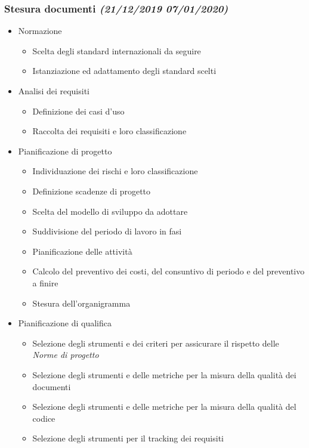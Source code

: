 \documentclass[../piano-di-progetto.tex]{subfiles}
\begin{document}
\subsubsection[Analisi e pianificazione]{Stesura documenti {\normalsize\normalfont\itshape(21/12/2019  07/01/2020)}}%
\label{subs:analisi_e_pianificazione}
\begin{itemize}
  \item Normazione
  \begin{itemize}
    \item Scelta degli standard internazionali da seguire
    \item Istanziazione ed adattamento degli standard scelti
  \end{itemize}
  \item Analisi dei requisiti
  \begin{itemize}
    \item Definizione dei casi d'uso
    \item Raccolta dei requisiti e loro classificazione
  \end{itemize}
  \item Pianificazione di progetto
  \begin{itemize}
    \item Individuazione dei rischi e loro classificazione
    \item Definizione scadenze di progetto
    \item Scelta del modello di sviluppo da adottare
    \item Suddivisione del periodo di lavoro in fasi
    \item Pianificazione delle attività
    \item Calcolo del preventivo dei costi, del consuntivo di periodo e del preventivo a finire
    \item Stesura dell'organigramma
  \end{itemize}
  \item Pianificazione di qualifica
  \begin{itemize}
    \item Selezione degli strumenti e dei criteri per assicurare il rispetto delle \textit{Norme di progetto}
    \item Selezione degli strumenti e delle metriche per la misura della qualità dei documenti
    \item Selezione degli strumenti e delle metriche per la misura della qualità del codice
    \item Selezione degli strumenti per il tracking dei requisiti

\end{itemize}
\end{itemize}
\end{document}
